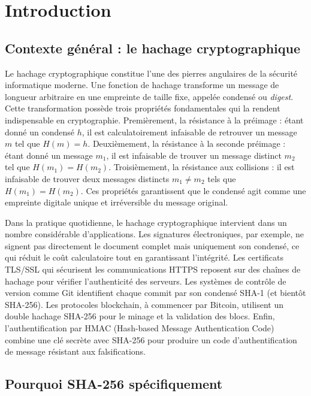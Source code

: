 \section{Introduction}
\label{sec:intro}

\subsection{Contexte général : le hachage cryptographique}

Le hachage cryptographique constitue l'une des pierres angulaires de la sécurité informatique moderne. Une fonction de hachage transforme un message de longueur arbitraire en une empreinte de taille fixe, appelée condensé ou \emph{digest}. Cette transformation possède trois propriétés fondamentales qui la rendent indispensable en cryptographie. Premièrement, la résistance à la préimage : étant donné un condensé $h$, il est calculatoirement infaisable de retrouver un message $m$ tel que $H(m) = h$. Deuxièmement, la résistance à la seconde préimage : étant donné un message $m_1$, il est infaisable de trouver un message distinct $m_2$ tel que $H(m_1) = H(m_2)$. Troisièmement, la résistance aux collisions : il est infaisable de trouver deux messages distincts $m_1 \neq m_2$ tels que $H(m_1) = H(m_2)$. Ces propriétés garantissent que le condensé agit comme une empreinte digitale unique et irréversible du message original.

Dans la pratique quotidienne, le hachage cryptographique intervient dans un nombre considérable d'applications. Les signatures électroniques, par exemple, ne signent pas directement le document complet mais uniquement son condensé, ce qui réduit le coût calculatoire tout en garantissant l'intégrité. Les certificats TLS/SSL qui sécurisent les communications HTTPS reposent sur des chaînes de hachage pour vérifier l'authenticité des serveurs. Les systèmes de contrôle de version comme Git identifient chaque commit par son condensé SHA-1 (et bientôt SHA-256). Les protocoles blockchain, à commencer par Bitcoin, utilisent un double hachage SHA-256 pour le minage et la validation des blocs. Enfin, l'authentification par HMAC (Hash-based Message Authentication Code) combine une clé secrète avec SHA-256 pour produire un code d'authentification de message résistant aux falsifications.

\subsection{Pourquoi SHA-256 spécifiquement}

